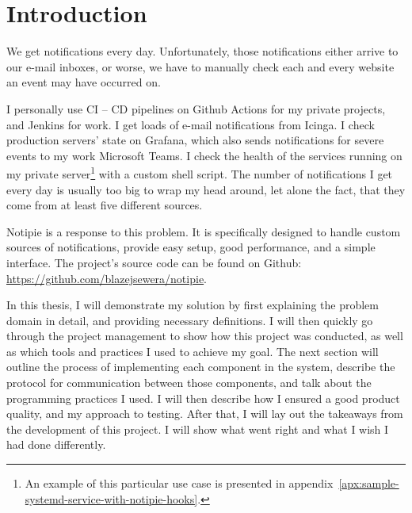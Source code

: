 \section{Introduction}\label{sec:introduction}

We get notifications every day.
Unfortunately,
those notifications either arrive
to our e-mail inboxes,
or worse,
we have to manually check
each and every website an event may have occurred on.

I personally use \ac{CI} -- \ac{CD} pipelines
on Github Actions for my private projects,
and Jenkins for work.
I get loads of e-mail notifications from Icinga.
I check production servers' state on Grafana,
which also sends notifications
for severe events to my work Microsoft Teams.
I check the health of the services
running on my private server\footnote{
  An example of this particular use case
  is presented in appendix~\ref{apx:sample-systemd-service-with-notipie-hooks}.
} with a custom shell script.
The number of notifications I get every day
is usually too big to wrap my head around,
let alone the fact,
that they come from at least five different sources.

Notipie is a response to this problem.
It is specifically designed
to handle custom sources of notifications,
provide easy setup,
good performance,
and a simple interface.
The project's source code can be found
on Github: \url{https://github.com/blazejsewera/notipie}.

In this thesis,
I will demonstrate my solution
by first explaining the problem domain in detail,
and providing necessary definitions.
I will then quickly go through
the project management
to show how this project was conducted,
as well as which tools and practices
I used to achieve my goal.
The next section
will outline the process of implementing
each component in the system,
describe the protocol for communication
between those components,
and talk about the programming practices I used.
I will then describe how I ensured
a good product quality,
and my approach to testing.
After that,
I will lay out the takeaways from the development
of this project.
I will show what went right
and what I wish I had done differently.



